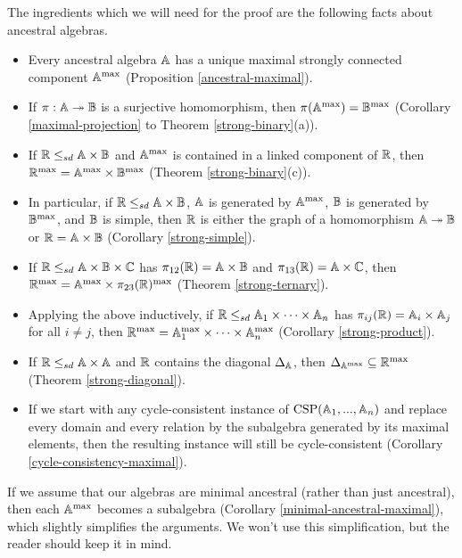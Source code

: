 \documentclass[letterpaper,11pt]{article}
\DeclareMathOperator{\CSP}{CSP}
\begin{document}
The ingredients which we will need for the proof are the following facts about ancestral algebras.
\begin{itemize}
\item Every ancestral algebra $\mathbb{A}$ has a unique maximal strongly connected component $\mathbb{A}^{\max}$ (Proposition \ref{ancestral-maximal}).

\item If $\pi : \mathbb{A} \twoheadrightarrow \mathbb{B}$ is a surjective homomorphism, then $\pi(\mathbb{A}^{\max}) = \mathbb{B}^{\max}$ (Corollary \ref{maximal-projection} to Theorem \ref{strong-binary}(a)).

\item If $\mathbb{R} \le_{sd} \mathbb{A} \times \mathbb{B}$ and $\mathbb{A}^{\max}$ is contained in a linked component of $\mathbb{R}$, then $\mathbb{R}^{\max} = \mathbb{A}^{\max}\times \mathbb{B}^{\max}$ (Theorem \ref{strong-binary}(c)).

\item In particular, if $\mathbb{R} \le_{sd} \mathbb{A} \times \mathbb{B}$, $\mathbb{A}$ is generated by $\mathbb{A}^{\max}$, $\mathbb{B}$ is generated by $\mathbb{B}^{\max}$, and $\mathbb{B}$ is simple, then $\mathbb{R}$ is either the graph of a homomorphism $\mathbb{A} \twoheadrightarrow \mathbb{B}$ or $\mathbb{R} = \mathbb{A} \times \mathbb{B}$ (Corollary \ref{strong-simple}).

\item If $\mathbb{R} \le_{sd} \mathbb{A} \times \mathbb{B} \times \mathbb{C}$ has $\pi_{12}(\mathbb{R}) = \mathbb{A} \times \mathbb{B}$ and $\pi_{13}(\mathbb{R}) = \mathbb{A} \times \mathbb{C}$, then $\mathbb{R}^{\max} = \mathbb{A}^{\max} \times \pi_{23}(\mathbb{R})^{\max}$ (Theorem \ref{strong-ternary}).

\item Applying the above inductively, if $\mathbb{R} \le_{sd} \mathbb{A}_1 \times \cdots \times \mathbb{A}_n$ has $\pi_{ij}(\mathbb{R}) = \mathbb{A}_i \times \mathbb{A}_j$ for all $i \ne j$, then $\mathbb{R}^{\max} = \mathbb{A}_1^{\max} \times \cdots \times \mathbb{A}_n^{\max}$ (Corollary \ref{strong-product}).

\item If $\mathbb{R} \le_{sd} \mathbb{A}\times \mathbb{A}$ and $\mathbb{R}$ contains the diagonal $\Delta_{\mathbb{A}}$, then $\Delta_{\mathbb{A}^{\max}} \subseteq \mathbb{R}^{\max}$ (Theorem \ref{strong-diagonal}).

\item If we start with any cycle-consistent instance of $\CSP(\bA_1, ..., \bA_n)$ and replace every domain and every relation by the subalgebra generated by its maximal elements, then the resulting instance will still be cycle-consistent (Corollary \ref{cycle-consistency-maximal}).
\end{itemize}
If we assume that our algebras are minimal ancestral (rather than just ancestral), then each $\mathbb{A}^{\max}$ becomes a subalgebra (Corollary \ref{minimal-ancestral-maximal}), which slightly simplifies the arguments. We won't use this simplification, but the reader should keep it in mind.
\end{document}
